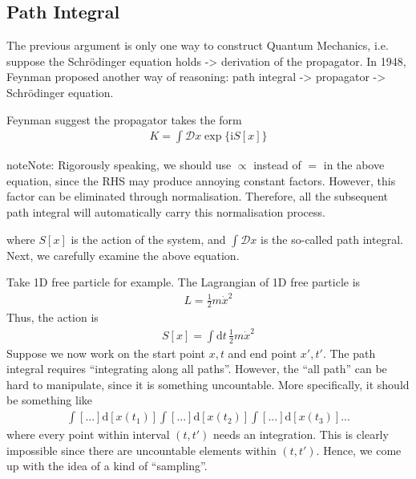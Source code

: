 \documentclass[letterpaper,10pt,english]{sphinxmanual}
\begin{document}
\subsection{Path Integral}
\label{\detokenize{pi_ppgt:path-integral}}
The previous argument is only one way to construct Quantum Mechanics, i.e. suppose the Schrödinger equation holds -\textgreater{} derivation of the propagator. In 1948, Feynman proposed another way of reasoning: path integral -\textgreater{} propagator -\textgreater{} Schrödinger equation.

Feynman suggest the propagator takes the form
\begin{equation*}
\begin{split}K = \int \mathcal{D}x \exp\{\mathrm{i}S[x]\}\end{split}
\end{equation*}
\begin{sphinxadmonition}{note}{Note:}
Rigorously speaking, we should use \(\propto\) instead of \(=\) in the above equation, since the RHS may produce annoying constant factors. However, this factor can be eliminated through normalisation. Therefore, all the subsequent path integral will automatically carry this normalisation process.
\end{sphinxadmonition}

where \(S[x]\) is the action of the system, and \(\int\mathcal{D}x\) is the so-called path integral. Next, we carefully examine the above equation.

Take 1D free particle for example. The Lagrangian of 1D free particle is
\begin{equation*}
\begin{split}L = \frac{1}{2}m\dot{x}^2\end{split}
\end{equation*}
Thus, the action is
\begin{equation*}
\begin{split}S[x] = \int\mathrm{d}t\,\frac{1}{2}m\dot{x}^2\end{split}
\end{equation*}
Suppose we now work on the start point \(x, t\) and end point \(x', t'\). The path integral requires ``integrating along all paths''. However, the ``all path'' can be hard to manipulate, since it is something uncountable. More specifically, it should be something like
\begin{equation*}
\begin{split}\int [...]\mathrm{d}[x(t_1)]\int [...]\mathrm{d}[x(t_2)]\int [...]\mathrm{d}[x(t_3)]...\end{split}
\end{equation*}
where every point within interval \((t,t')\) needs an integration. This is clearly impossible since there are uncountable elements within \((t,t')\). Hence, we come up with the idea of a kind of ``sampling''.
\end{document}

